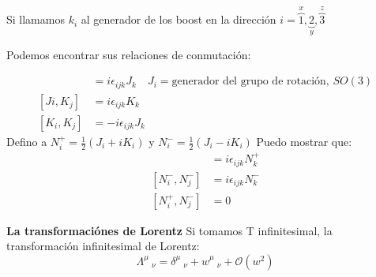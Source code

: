 \documentclass[a4paper,12pt]{article}
\begin{document}
Si llamamos $k_i $ al generador de los boost en la dirección  $i = \overbrace{1}^{x},\underbrace{2} _{y},\overbrace{3 }^{z} $ 

Podemos encontrar sus relaciones de conmutación: 

\begin{align*}
    [J_i, J_j ] &= i \epsilon_{ijk}  J_k \quad J_i = \text{generador del grupo de rotación, } SO(3)\\
    [Ji, K_j ] &= i \epsilon_{ijk} K_k \\
    [K_i, K_j] &= - i \epsilon_{ijk} J_k 
\end{align*}
Defino a $N^+_{i} = \frac{1}{2}(J_i +i K_i ) $ y $N^-_{i}= \frac{1}{2}(J_i-iK_i   )  $
Puedo mostrar que: 
\begin{align*}
    [N^+_i, N^+_j] &= i \epsilon_{ijk} N^+_k \\
    [N^-_i , N^-_j ] &= i \epsilon_{ijk} N^-_k \\
    [N^+_i , N^- _j] &= 0
\end{align*}




\textbf{La transformaciónes de Lorentz}
Si tomamos T infinitesimal, la transformación infinitesimal de Lorentz:
\[
\Lambda^\mu_{\quad \nu  } = \delta^\mu_{ \quad \nu}+w^\mu_{\quad \nu}+ \mathcal{O}( w^2)
\]
 
 
\end{document}
